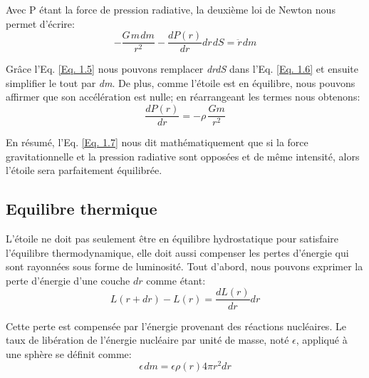 Avec P étant la force de pression radiative, la deuxième loi de Newton nous permet
d'écrire\footnotemark[3]:\begin{equation}-\dfrac{G\hspace{1pt}m\hspace{1pt}dm}{r^{2}}-\dfrac{dP(r)}{dr}dr\hspace{1pt}dS=\ddot r\hspace{1pt}dm\label{Eq. 1.6}\end{equation}

Grâce l'Eq. \ref{Eq. 1.5} nous pouvons remplacer \textit{dr\hspace{1pt}dS} dans l'Eq. \ref{Eq. 1.6} et ensuite simplifier le tout par \textit{dm}. De plus, comme l'étoile est en équilibre, nous pouvons affirmer que son accélération est nulle; en réarrangeant les termes nous obtenons:\begin{equation}\boxed{\dfrac{dP(r)}{dr}=-\rho\hspace{2pt}\frac{Gm}{r^{2}}}\label{Eq. 1.7}\end{equation}

En résumé, l'Eq. \ref{Eq. 1.7} nous dit mathématiquement que si la force gravitationnelle et la pression radiative sont opposées et de même intensité, alors l'étoile sera parfaitement équilibrée.


\subsection{Equilibre thermique}

L'étoile ne doit pas seulement être en équilibre hydrostatique pour satisfaire l'équilibre thermodynamique, elle doit aussi compenser les pertes d'énergie qui sont rayonnées sous forme de luminosité. Tout d'abord, nous pouvons exprimer la perte d'énergie d'une couche $dr$ comme étant:\begin{equation}L(r+dr)-L(r)=\dfrac{dL(r)}{dr}dr\label{Eq. 1.8}\end{equation}

Cette perte est compensée par l'énergie provenant des réactions nucléaires. Le taux de libération de l'énergie nucléaire par unité de masse, noté $\epsilon$, appliqué à une sphère se définit comme:\begin{equation}\epsilon\hspace{1pt}dm=\epsilon\rho(r)4\pi r^{2}dr\label{Eq. 1.9}\end{equation}

